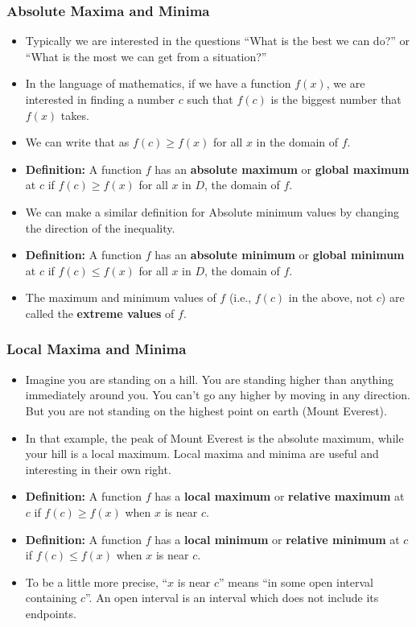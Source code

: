 \documentclass[serif,ignorenonframetext]{beamer}
\begin{document}
\begin{frame}
  \frametitle{Absolute Maxima and Minima}
  \begin{itemize}[<+->]
  \item Typically we are interested in the questions ``What is the best
    we can do?'' or ``What is the most we can get from a situation?''
  \item In the language of mathematics, if we have a function $f(x)$,
    we are interested in finding a number $c$ such that $f(c)$ is the 
    biggest number that $f(x)$ takes.
  \item We can write that as $f(c)\ge f(x)$ for all $x$ in the
    domain of $f$.
  \item \textbf{Definition:}  A function $f$ has an \textbf{absolute
    maximum} or \textbf{global maximum} at $c$ if $f(c)\ge f(x)$ for 
    all $x$ in $D$, the domain of $f$.
  \item We can make a similar definition for Absolute minimum values
    by changing the direction of the inequality.
  \item \textbf{Definition:}  A function $f$ has an \textbf{absolute
    minimum} or \textbf{global minimum} at $c$ if $f(c)\le f(x)$ for
    all $x$ in $D$, the domain of $f$.
  \item The maximum and minimum values of $f$ (i.e., $f(c)$ in the above,
    not $c$) are called the \textbf{extreme values} of $f$.
  \end{itemize}
\end{frame}


\begin{frame}
  \frametitle{Local Maxima and Minima}
  \begin{itemize}[<+->]
  \item Imagine you are standing on a hill.  You are standing higher than
    anything immediately around you.  You can't go any higher by moving
    in any direction.
    But you are not standing on the highest point on earth (Mount 
    Everest).
  \item In that example, the peak of Mount Everest is the absolute maximum,
    while your hill is a local maximum.  Local maxima and minima are useful
    and interesting in their own right.
  \item \textbf{Definition:} A function $f$ has a \textbf{local maximum}
    or \textbf{relative maximum} at $c$ if $f(c)\ge f(x)$ when $x$ is near
    $c$.
  \item \textbf{Definition:} A function $f$ has a \textbf{local minimum}
    or \textbf{relative minimum} at $c$ if $f(c)\le f(x)$ when $x$ is
    near $c$.
  \item To be a little more precise, ``$x$ is near $c$'' means ``in some
    open interval containing $c$''.  An open interval is an interval which
    does not include its endpoints.
  \end{itemize}
\end{frame}
\end{document}
